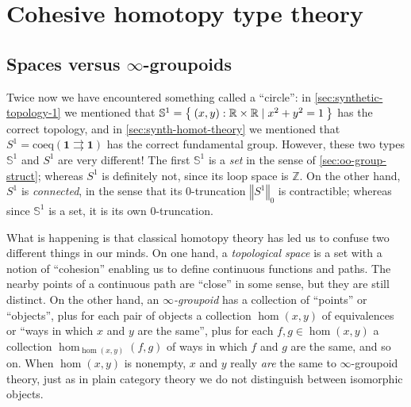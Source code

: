 \documentclass[12pt]{article}
\let\setof\Set
\def\oo{\ensuremath{\infty}}
\def\Z{\mathbb{Z}}
\def\R{\mathbb{R}}
\def\hocirc{S^1}
\def\topcirc{\mathbb{S}^1}
\def\unit{\mathbf{1}}
\numberwithin{equation}{section}
\newcommand{\trunc}[2]{\mathopen{}\left\Vert #2\right\Vert_{#1}\mathclose{}}
\begin{document}
\section{Cohesive homotopy type theory}
\label{sec:cohes-homot-type}

\subsection{Spaces versus \oo-groupoids}
\label{sec:spaces-oo-groupoids}

Twice now we have encountered something called a ``circle'': in \cref{sec:synthetic-topology-1} we mentioned that $\topcirc = \setof{ (x,y):\R\times\R \mid x^2+y^2=1 }$ has the correct topology, and in \cref{sec:synth-homot-theory} we mentioned that $\hocirc = \mathrm{coeq}(\unit \rightrightarrows \unit)$ has the correct fundamental group.
However, these two types $\topcirc$ and $\hocirc$ are very different!
The first $\topcirc$ is a \emph{set} in the sense of \cref{sec:oo-group-struct}; %
whereas $\hocirc$ is definitely not, since its loop space is $\Z$.
On the other hand, $\hocirc$ is \emph{connected}, in the sense that its 0-truncation $\trunc 0 \hocirc$ is contractible; whereas since $\topcirc$ is a set, it is its own 0-truncation.

What is happening is that classical homotopy theory has led us to confuse two different things in our minds.
On one hand, a \emph{topological space} is a set with a notion of ``cohesion'' enabling us to define continuous functions and paths.
The nearby points of a continuous path are ``close'' in some sense, but they are still distinct.
On the other hand, an \emph{\oo-groupoid} has a collection of ``points'' or ``objects'', plus for each pair of objects a collection $\hom(x,y)$ of equivalences or ``ways in which $x$ and $y$ are the same'', plus for each $f,g\in \hom(x,y)$ a collection $\hom_{\hom(x,y)}(f,g)$ of ways in which $f$ and $g$ are the same, and so on.
When $\hom(x,y)$ is nonempty, $x$ and $y$ really \emph{are} the same to \oo-groupoid theory, just as in plain category theory we do not distinguish between isomorphic objects.
\end{document}
